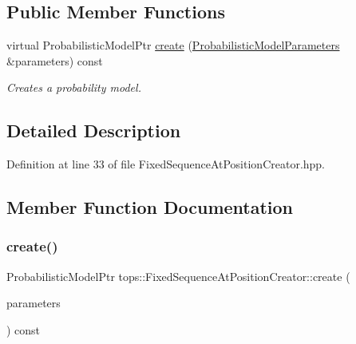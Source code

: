 \subsection*{Public Member Functions}
\begin{DoxyCompactItemize}
\item 
virtual Probabilistic\+Model\+Ptr \hyperlink{classtops_1_1FixedSequenceAtPositionCreator_af4daf171afbef0494ee98f9877ff1787}{create} (\hyperlink{classtops_1_1ProbabilisticModelParameters}{Probabilistic\+Model\+Parameters} \&parameters) const
\begin{DoxyCompactList}\small\item\em Creates a probability model. \end{DoxyCompactList}\end{DoxyCompactItemize}


\subsection{Detailed Description}


Definition at line 33 of file Fixed\+Sequence\+At\+Position\+Creator.\+hpp.



\subsection{Member Function Documentation}
\mbox{\label{classtops_1_1FixedSequenceAtPositionCreator_af4daf171afbef0494ee98f9877ff1787}} 
\subsubsection{\texorpdfstring{create()}{create()}}
{\footnotesize\ttfamily Probabilistic\+Model\+Ptr tops\+::\+Fixed\+Sequence\+At\+Position\+Creator\+::create (\begin{DoxyParamCaption}\item[{\hyperlink{classtops_1_1ProbabilisticModelParameters}{Probabilistic\+Model\+Parameters} \&}]{parameters }\end{DoxyParamCaption}) const\hspace{0.3cm}{\ttfamily [virtual]}}



